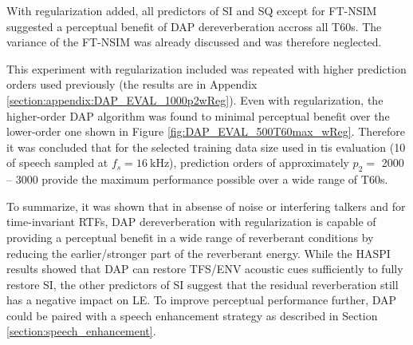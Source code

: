 With regularization added, all predictors of SI and SQ except for FT-NSIM suggested a perceptual benefit of DAP dereverberation accross all T60s. The variance of the FT-NSIM was already discussed and was therefore neglected. 

This experiment with regularization included was repeated with higher prediction orders used previously (the results are in Appendix \ref{section:appendix:DAP_EVAL_1000p2wReg}). Even with regularization, the higher-order DAP algorithm was found to minimal perceptual benefit over the lower-order one shown in Figure \ref{fig:DAP_EVAL_500T60max_wReg}. Therefore it was concluded that for the selected training data size used in tis evaluation (\qty{10}{\sec} of speech sampled at $f_s=\qty{16}{\kilo\hertz}$), prediction orders of approximately $p_2 = $ 2000 -- 3000 provide the maximum performance possible over a wide range of T60s.

To summarize, it was shown that in absense of noise or interfering talkers and for time-invariant RTFs, DAP dereverberation with regularization is capable of providing a perceptual benefit in a wide range of reverberant conditions by reducing the earlier/stronger part of the reverberant energy. While the HASPI results showed that DAP can restore TFS/ENV acoustic cues sufficiently to fully restore SI, the other predictors of SI suggest that the residual reverberation still has a negative impact on LE. To improve perceptual performance further, DAP could be paired with a speech enhancement strategy as described in Section \ref{section:speech_enhancement}.


